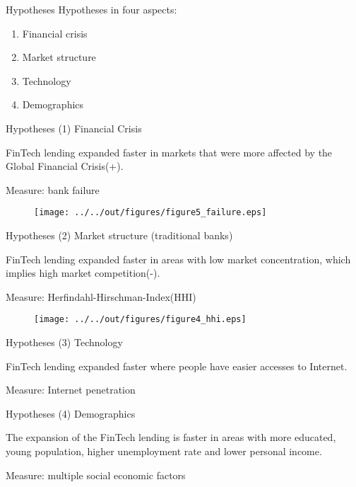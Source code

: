 \documentclass[11pt]{beamer}
\begin{document}
\begin{frame}{Hypotheses}
    Hypotheses in four aspects:
    \begin{enumerate}
        \item Financial crisis
        \item Market structure
        \item Technology
        \item Demographics
    \end{enumerate}
\end{frame}


\begin{frame}{Hypotheses}
    (1) Financial Crisis

    FinTech lending expanded faster in markets that were more affected by the Global Financial Crisis(+). 

    Measure: bank failure

    \begin{figure}
        \texttt{[image: ../../out/figures/figure5\_failure.eps]}
    \end{figure}
\end{frame}


\begin{frame}{Hypotheses}
    (2) Market structure (traditional banks)

    FinTech lending expanded faster in areas with low market concentration, which implies high market competition(-).

    Measure: Herfindahl-Hirschman-Index(HHI)

    \begin{figure}
        \texttt{[image: ../../out/figures/figure4\_hhi.eps]}
    \end{figure}
\end{frame}



\begin{frame}{Hypotheses}
    (3) Technology

    FinTech lending expanded faster where people have easier accesses to Internet. 

    Measure: Internet penetration
\end{frame}


\begin{frame}{Hypotheses}
    (4) Demographics

    The expansion of the FinTech lending is faster in areas with more educated, young population, higher unemployment rate and lower personal income. 

    Measure: multiple social economic factors
\end{frame}
\end{document}
